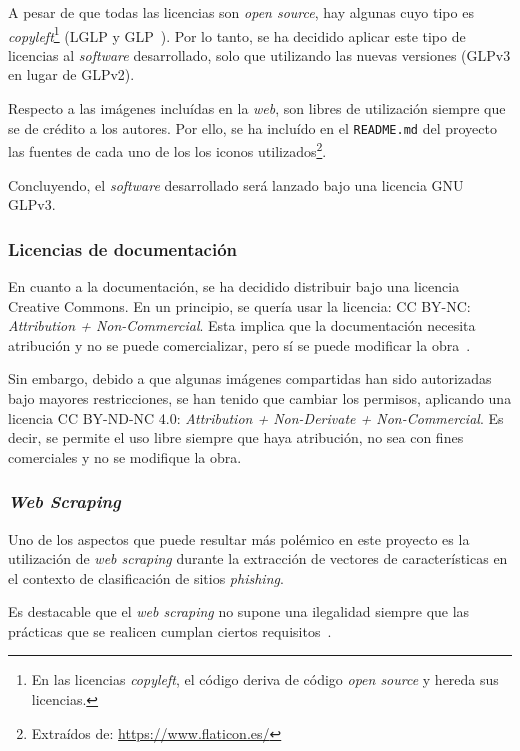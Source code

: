A pesar de que todas las licencias son \textit{open source}, hay algunas cuyo tipo es \textit{copyleft}\footnote{En las licencias \textit{copyleft}, el código deriva de código \textit{open source} y hereda sus licencias.} (LGLP y GLP~\cite{oslicenses}). Por lo tanto, se ha decidido aplicar este tipo de licencias al \textit{software} desarrollado, solo que utilizando las nuevas versiones (GLPv3 en lugar de GLPv2).

Respecto a las imágenes incluídas en la \textit{web}, son libres de utilización siempre que se de crédito a los autores. Por ello, se ha incluído en el \texttt{README.md} del proyecto las fuentes de cada uno de los los iconos utilizados\footnote{Extraídos de: \url{https://www.flaticon.es/}}.

Concluyendo, el \textit{software} desarrollado será lanzado bajo una licencia GNU GLPv3.

\subsubsection{Licencias de documentación}

En cuanto a la documentación, se ha decidido distribuir bajo una licencia Creative Commons. En un principio, se quería usar la licencia: CC BY-NC: \textit{Attribution + Non-Commercial}. Esta implica que la documentación necesita atribución y no se puede comercializar, pero sí se puede modificar la obra~\cite{cclicenses}.

Sin embargo, debido a que algunas imágenes compartidas han sido autorizadas bajo mayores restricciones, se han tenido que cambiar los permisos, aplicando una licencia CC BY-ND-NC 4.0:\textit{ Attribution + Non-Derivate + Non-Commercial}. Es decir, se permite el uso libre siempre que haya atribución, no sea con fines comerciales y no se modifique la obra.

\subsubsection{\textit{Web Scraping}}

Uno de los aspectos que puede resultar más polémico en este proyecto es la utilización de \textit{web scraping} durante la extracción de vectores de características en el contexto de clasificación de sitios \textit{phishing}.

Es destacable que el \textit{web scraping} no supone una ilegalidad siempre que las prácticas que se realicen cumplan ciertos requisitos~\cite{legalidadWebScrapingI}.

